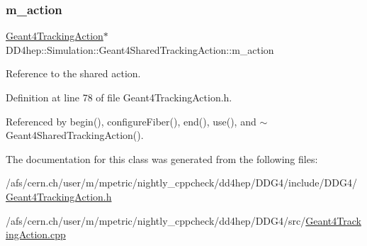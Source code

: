 \subsubsection{\texorpdfstring{m\+\_\+action}{m\_action}}
{\footnotesize\ttfamily \hyperlink{class_d_d4hep_1_1_simulation_1_1_geant4_tracking_action}{Geant4\+Tracking\+Action}$\ast$ D\+D4hep\+::\+Simulation\+::\+Geant4\+Shared\+Tracking\+Action\+::m\+\_\+action\hspace{0.3cm}{\ttfamily [protected]}}



Reference to the shared action. 



Definition at line 78 of file Geant4\+Tracking\+Action.\+h.



Referenced by begin(), configure\+Fiber(), end(), use(), and $\sim$\+Geant4\+Shared\+Tracking\+Action().



The documentation for this class was generated from the following files\+:\begin{DoxyCompactItemize}
\item 
/afs/cern.\+ch/user/m/mpetric/nightly\+\_\+cppcheck/dd4hep/\+D\+D\+G4/include/\+D\+D\+G4/\hyperlink{_geant4_tracking_action_8h}{Geant4\+Tracking\+Action.\+h}\item 
/afs/cern.\+ch/user/m/mpetric/nightly\+\_\+cppcheck/dd4hep/\+D\+D\+G4/src/\hyperlink{_geant4_tracking_action_8cpp}{Geant4\+Tracking\+Action.\+cpp}\end{DoxyCompactItemize}
